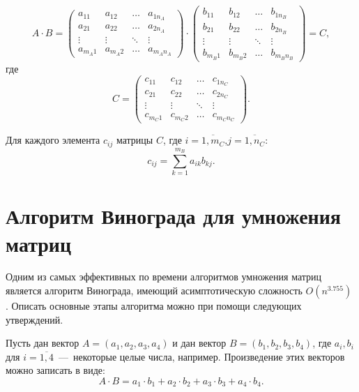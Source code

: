 \begin{equation} \label{eqn:ABmul}
	A \cdot B = \begin{pmatrix}
		a_{11} & a_{12} & \ldots & a_{1n_A}\\
		a_{21} & a_{22} & \ldots & a_{2n_A}\\
		\vdots & \vdots & \ddots & \vdots\\
		a_{m_A1} & a_{m_A2} & \ldots & a_{m_An_A}
	\end{pmatrix} \cdot \begin{pmatrix}
		b_{11} & b_{12} & \ldots & b_{1n_B}\\
		b_{21} & b_{22} & \ldots & b_{2n_B}\\
		\vdots & \vdots & \ddots & \vdots\\
		b_{m_B1} & b_{m_B2} & \ldots & b_{m_Bn_B}
	\end{pmatrix} = C,
\end{equation}
где
\begin{equation} \label{eqn:С}
	C = \begin{pmatrix}
		c_{11} & c_{12} & \ldots & c_{1n_C}\\
		c_{21} & c_{22} & \ldots & c_{2n_C}\\
		\vdots & \vdots & \ddots & \vdots\\
		c_{m_C1} & c_{m_C2} & \ldots & c_{m_Cn_C}
	\end{pmatrix}.
\end{equation}

Для каждого элемента $c_{ij}$ матрицы $C$, где $i = \overline{1,m_C}$,$j = \overline{1,n_C}$:
\begin{equation}
	\label{eq:Celem}
	c_{ij} = \sum_{k=1}^{m_B} a_{ik}b_{kj}.
\end{equation}

\section{Алгоритм Винограда для умножения матриц}
Одним из самых эффективных по времени алгоритмов умножения матриц является алгоритм Винограда, имеющий асимптотическую сложность $O(n^{3.755})$ \cite{web_item6}. Описать основные этапы алгоритма можно при помощи следующих утверждений.

Пусть дан вектор $A = (a_1,a_2,a_3,a_4)$ и дан вектор $B = (b_1,b_2,b_3,b_4)$, где $a_i, b_i$ для $i = \overline{1,4}$~---~некоторые целые числа, например. Произведение этих векторов можно записать в виде:
\begin{equation} \label{eqn:ABvec}
	A \cdot B = a_1 \cdot b_1 + a_2 \cdot b_2 + a_3 \cdot b_3 + a_4 \cdot b_4.
\end{equation}

